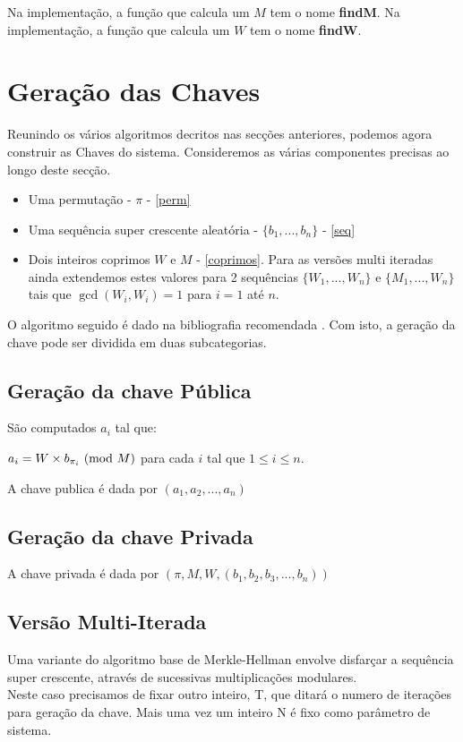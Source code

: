 \documentclass[11pt, language=portuguese]{report}
\begin{document}
Na implementação, a função que calcula um $M$ tem o nome \textbf{findM}.
Na implementação, a função que calcula um $W$ tem o nome \textbf{findW}.

\section{Geração das Chaves}
\label{gkey}
Reunindo os vários algoritmos decritos nas secções anteriores, podemos agora construir as Chaves do sistema.
Consideremos as várias componentes precisas ao longo deste secção.
\begin{itemize}
	\item Uma permutação - $\pi$ - \ref{perm}
	\item Uma sequência super crescente aleatória - $\{b_1, ..., b_n\}$ - \ref{seq}
	\item Dois inteiros coprimos $W$ e $M$ - \ref{coprimos}. Para as versões multi iteradas ainda extendemos estes valores para 2 sequências $\{W_1, ..., W_n\}$ e $\{M_1, ..., W_n\}$ tais que $\gcd(W_i, W_i) = 1$ para $i = 1$ até $n$.
\end{itemize}

O algoritmo seguido é dado na bibliografia recomendada \autocite{handbook}.
Com isto, a geração da chave pode ser dividida em duas subcategorias.

\subsection{Geração da chave Pública}
\begin{definition}\label{def:4}
	São computados ${a_i}$ tal que:
	\begin{center}
		$a_i = W \times b_{\pi_i} \ (\mathrm{mod}\ M)$ para cada $i$ tal que $1 \le i \le n$.
        \end{center}
\end{definition}
A chave publica é dada por $({a_1, a_2, ..., a_n})$

\subsection{Geração da chave Privada}
A chave privada é dada por $(\pi, M, W, {(b_1, b_2, b_3, ..., b_n)})$

\subsection{Versão Multi-Iterada}
Uma variante do algoritmo base de Merkle-Hellman envolve disfarçar a sequência super crescente, através de sucessivas multiplicações modulares.
\\
Neste caso precisamos de fixar outro inteiro, T, que ditará o numero de iterações para geração da chave.
Mais uma vez um inteiro N é fixo como parâmetro de sistema.
\\
\end{document}
